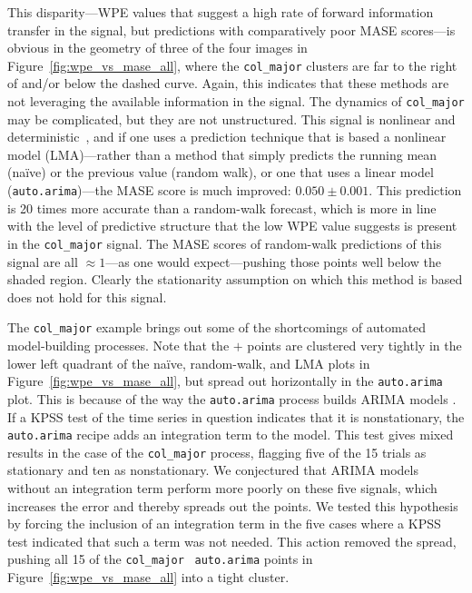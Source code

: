 \documentclass[%
pre,
reprint,
superscriptaddress,
showpacs,
nofootinbib,
nobibnotes,
 amsmath,amssymb,
 aps,
]{revtex4-1}
\newcommand{\arima}{{\tt auto.arima}\xspace}
\newcommand{\naive}{na\"ive}
\newcommand{\col}{{\tt col\_major}\xspace}
\newcommand{\alert}[1]{{\color{red}#1}}
\begin{document}
This disparity---WPE values that suggest a high rate of forward
information transfer in the signal, but predictions with comparatively
poor MASE scores---is obvious in the geometry of three of the four
images in Figure~\ref{fig:wpe_vs_mase_all}, where the \col clusters
are far to the right of and/or below the dashed curve.  Again, this
indicates that these methods are not leveraging the available
information in the signal.  The dynamics of \col may be complicated,
but they are not unstructured.  This signal is nonlinear and
deterministic~\cite{mytkowicz09}, and if one uses a prediction
technique that is based a nonlinear model (LMA)---rather than a method
that simply predicts the running mean (\naive) or the previous value
(random walk), or one that uses a linear model (\arima)---the MASE
score is much improved: $0.050 \pm 0.001$.  This prediction is 20
times more accurate than a random-walk forecast, which is more in line
with the level of predictive structure that the low WPE value suggests
is present in the \col signal.  The MASE scores of random-walk
predictions of this signal are all $\approx 1$---as one would
expect---pushing those points well below the shaded region.  Clearly
the stationarity assumption on which this method is based does not
hold for this signal.

The \col example brings out some of the shortcomings of automated
model-building processes.  Note that the {\color{blue}$+$} points are
clustered very tightly in the lower left quadrant of the \naive,
random-walk, and LMA plots in Figure~\ref{fig:wpe_vs_mase_all}, but
spread out horizontally in the \arima plot.  This is because of the
way the \arima process builds ARIMA models \cite{autoARIMA}.  If a
KPSS test of the time series in question indicates that it is
nonstationary, the \arima recipe adds an integration term to the
model.  This test gives mixed results in the case of the \col process,
flagging five of the 15 trials as stationary and ten as nonstationary.
We conjectured that ARIMA models without an integration term perform
more poorly on these five signals, which increases the error and
thereby spreads out the points.  We tested this hypothesis by forcing
the inclusion of an integration term in the five cases where a KPSS
test indicated that such a term was not needed.  This action removed
the spread, pushing all 15 of the \col ~ \arima points in
Figure~\ref{fig:wpe_vs_mase_all} into a tight cluster.
\end{document}
